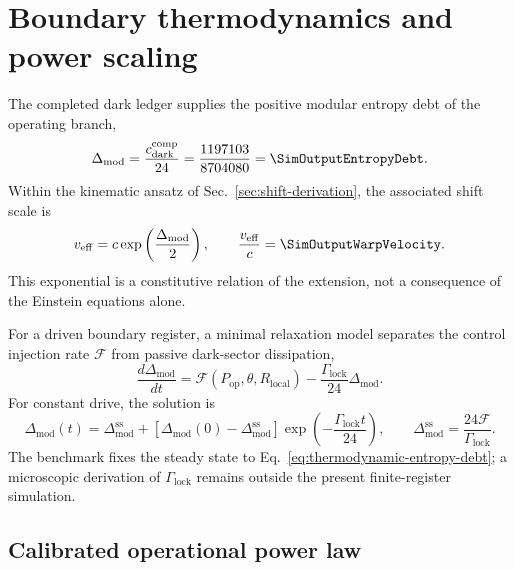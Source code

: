 \section{Boundary thermodynamics and power scaling}\label{sec:thermodynamics-power}

The completed dark ledger supplies the positive modular entropy debt of the
operating branch,
\begin{equation}
  \Delta_{\mathrm{mod}}
  =\frac{c_{\mathrm{dark}}^{\mathrm{comp}}}{24}
  =\frac{1197103}{8704080}
  =\SimOutputEntropyDebt.
  \label{eq:thermodynamic-entropy-debt}
\end{equation}
Within the kinematic ansatz of Sec.~\ref{sec:shift-derivation}, the associated
shift scale is
\begin{equation}
  v_{\mathrm{eff}}
  =c\exp\left(\frac{\Delta_{\mathrm{mod}}}{2}\right),
  \qquad
  \frac{v_{\mathrm{eff}}}{c}
  =\SimOutputWarpVelocity.
  \label{eq:thermodynamic-effective-velocity}
\end{equation}
This exponential is a constitutive relation of the extension, not a
consequence of the Einstein equations alone.

For a driven boundary register, a minimal relaxation model separates the
control injection rate \(\mathcal F\) from passive dark-sector dissipation,
\begin{equation}
  \frac{d\Delta_{\mathrm{mod}}}{dt}
  =\mathcal F(P_{\mathrm{op}},\theta,R_{\mathrm{local}})
  -\frac{\Gamma_{\mathrm{lock}}}{24}\Delta_{\mathrm{mod}}.
  \label{eq:entropy-debt-rate-equation}
\end{equation}
For constant drive, the solution is
\begin{equation}
  \Delta_{\mathrm{mod}}(t)
  =\Delta_{\mathrm{mod}}^{\mathrm{ss}}
  +\left[
    \Delta_{\mathrm{mod}}(0)-\Delta_{\mathrm{mod}}^{\mathrm{ss}}
  \right]
  \exp\left(-\frac{\Gamma_{\mathrm{lock}}t}{24}\right),
  \qquad
  \Delta_{\mathrm{mod}}^{\mathrm{ss}}
  =\frac{24\mathcal F}{\Gamma_{\mathrm{lock}}}.
  \label{eq:entropy-debt-relaxation-solution}
\end{equation}
The benchmark fixes the steady state to
Eq.~\eqref{eq:thermodynamic-entropy-debt}; a microscopic derivation of
\(\Gamma_{\mathrm{lock}}\) remains outside the present finite-register
simulation.

\subsection{Calibrated operational power law}


